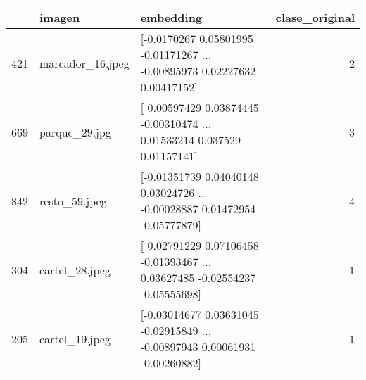 \begin{tabular}{lllr}
\toprule
 & imagen & embedding & clase\_original \\
\midrule
421 & marcador\_16.jpeg & [-0.0170267   0.05801995 -0.01171267 ... -0.00895973  0.02227632
  0.00417152] & 2 \\
669 & parque\_29.jpg & [ 0.00597429  0.03874445 -0.00310474 ...  0.01533214  0.037529
  0.01157141] & 3 \\
842 & resto\_59.jpeg & [-0.01351739  0.04040148  0.03024726 ... -0.00028887  0.01472954
 -0.05777879] & 4 \\
304 & cartel\_28.jpeg & [ 0.02791229  0.07106458 -0.01393467 ...  0.03627485 -0.02554237
 -0.05555698] & 1 \\
205 & cartel\_19.jpeg & [-0.03014677  0.03631045 -0.02915849 ... -0.00897943  0.00061931
 -0.00260882] & 1 \\
\bottomrule
\end{tabular}
